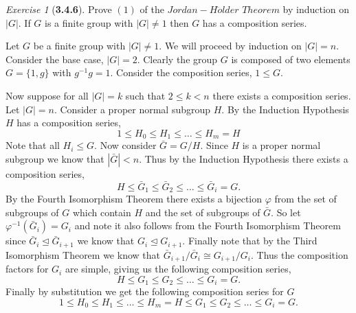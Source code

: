 \documentclass[12pt]{amsart}
\makeatletter
\theoremstyle{remark}
\newtheorem*{exercise}{Exercise}%
\renewenvironment{proof}[1][\proofname]{\par\doublespacing
  \pushQED{\qed}%
  \normalfont \topsep6\p@\@plus6\p@\relax
  \list{}{%
    \settowidth{\leftmargin}{\itshape\proofname:\hskip\labelsep}%
    \setlength{\labelwidth}{0pt}%
    \setlength{\itemindent}{-\leftmargin}%
  }%
  \item[\hskip\labelsep\itshape#1\@addpunct{:}]\ignorespaces
}{%
  \popQED\endlist\@endpefalse
  \singlespacing
}
\theoremstyle{mycomment}
\makeatother
\begin{document}
\begin{exercise}[\textbf{3.4.6}] Prove $(1)$ of the $Jordan-H\ddot{o}lder$ $Theorem$ by induction on $|G|$. If $G$ is a finite group with $|G| \neq 1$ then $G$ has a composition series. 
  \begin{proof} Let $G$ be a finite group with $|G| \neq 1$. We will proceed by induction on $|G| = n$. Consider 
    the base case, $|G| = 2$. Clearly the group $G$ is composed of two elements $G = \{1, g\}$ with $g^{-1}g = 1$. 
    Consider the composition series, $1 \leq G$. 

    Now suppose for all $|G| = k$ such that $2 \leq k < n$ there exists a composition series. Let $|G| = n$. Consider a proper normal subgroup $H$. By the Induction Hypothesis $H$ has a composition series, 
    \begin{equation*}
      1 \leq H_0 \leq H_1 \leq \dots \leq H_m = H
    \end{equation*}
    Note that all $H_i \leq G$. Now consider $\bar{G} = G/H$. Since $H$ is a proper normal subgroup we know that $|\bar{G}|<n$. Thus by the Induction Hypothesis there exists a composition series, 
    \begin{equation*}
      H \leq \bar{G}_1 \leq \bar{G}_2 \leq \dots \leq \bar{G}_i = G.
    \end{equation*}
    By the Fourth Isomorphism Theorem there exists a bijection $\varphi$ from the set of subgroups of $G$ which contain $H$ and the set of subgroups of $\bar{G}$. So let $\varphi^{-1}(\bar{G}_i) = G_i$ and note it also follows from the Fourth Isomorphism Theorem since $\bar{G}_{i} \trianglelefteq \bar{G}_{i + 1}$ we know that $G_i \trianglelefteq G_{i + 1}$. Finally note that by the Third Isomorphism Theorem we know that $\bar{G}_{i + 1}/\bar{G}_{i} \cong G_{i + 1}/G_{i}$. Thus the composition factors for $G_i$ are simple, giving us the following composition series, 
    \begin{equation*}
      H \leq G_1 \leq G_2 \leq \dots \leq G_i = G.
    \end{equation*}
    Finally by substitution we get the following composition series for $G$
    \begin{equation*}
      1 \leq H_0 \leq H_1 \leq \dots \leq H_m = H \leq G_1 \leq G_2 \leq \dots \leq G_i = G.
    \end{equation*}
  \end{proof}
\end{exercise}
\vspace{.15in}
\end{document}

